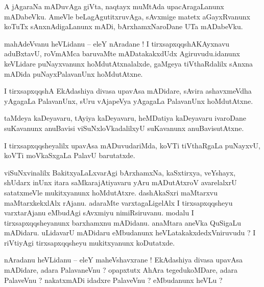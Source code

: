 \documentclass{article}
\begin{document}
\begin{mn}%
A jAgaraNa mADuvAga giVta, naqtayx muMtAda upacAragaLanunx mADabeVku. AmeVle beLagAgutitxruvAga, 
sAvxmige matetx aGayxRvanunx koTuTx sAnxnAdigaLanunx mADi, bArxhamxNaroDane UTa mADabeVku.
\end{mn}

\begin{mn}%
mahAdeVvanu heVLidanu -- eleY nAradane ! I tirxsapxqqshAKAyxnavu aduBxtavU, roVmAMca baruvaMte 
mADatakakxdUdx Agiruvudu.idanunx keVLidare puNayxvanunx hoMdutAtxnalalxde, gaMgeya tiVthaRdalilx 
sAnxna mADida puNayxPalavanUnx hoMdutAtxne.
\end{mn}

\begin{mn}%
I tirxsapxqqshA EkAdashiya divasa upavAsa mADidare, sAvira ashavxmeVdha yAgagaLa PalavanUnx, sUru 
vAjapeVya yAgagaLa PalavanUnx hoMdutAtxne.
\end{mn}

\begin{mn}%
taMdeya kaDeyavaru, tAyiya kaDeyavaru, heMDatiya kaDeyavaru ivaroDane suKavanunx anuBavisi 
viSuNxloVkadalilxyU suKavanunx anuBavisutAtxne.
\end{mn}

\begin{mn}%
I tirxsapxqqsheyalilx upavAsa mADuvudariMda, koVTi tiVthaRgaLa puNayxvU, koVTi moVkaSxgaLa PalavU 
barutatxde.
\end{mn}

\begin{mn}%
viSuNxvinalilx BakitxyaLaLxvarAgi bArxhamxNa, kaSxtirxya, veYshayx, shUdarx inUnx itara 
saMkarajAtiyavaru yAru mADutAtxroV avarelalxrU satatxmeVle mukitxyanunx hoMdutAtxre. dashAkaSxri 
maMtarxvu maMtarxkekxlAlx rAjanu. adaraMte varxtagaLigelAlx I tirxsapxqqsheyu varxtarAjanu 
eMbudAgi sAvxmiyu nimiRsiruvanu. modalu I tirxsapxqqsheyanunx barxhamxnu mADidanu. anaMtara aneVka 
QuSigaLu mADidaru. uLidavarU mADidaru eMbudanunx heVLatakakxdedxVniruvudu ? I riVtiyAgi 
tirxsapxqqsheyu mukitxyanunx koDutatxde.
\end{mn}


\begin{mn}%
nAradanu heVLidanu -- eleY maheVshavxrane ! EkAdashiya divasa upavAsa mADidare, adara PalavaneVnu ? 
opapxtutx AhAra tegedukoMDare, adara PalaveVnu ? nakatxmADi idadxre PalaveVnu ? eMbudanunx heVLu ?
\end{mn}
\end{document}
